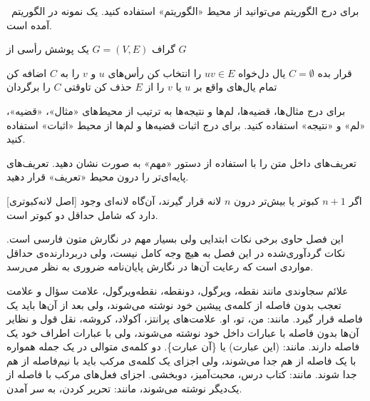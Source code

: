 



برای درج الگوریتم می‌توانید از محیط «الگوریتم» استفاده کنید.
یک نمونه در الگوریتم~ آمده است.

 گراف $G=(V, E)$
 یک پوشش رأسی از $G$

 قرار بده $C = \emptyset$  %
 یال دل‌‌خواه $uv \in E$ را انتخاب کن
 رأس‌های $u$ و $v$ را به $C$ اضافه کن
 تمام یال‌های واقع بر $u$ یا $v$ را از $E$ حذف کن
‌تاوقتی
 $C$ را برگردان



برای درج مثال‌ها، قضیه‌ها، لم‌ها و نتیجه‌ها به ترتیب از محیط‌های
«مثال»، «قضیه»، «لم» و «نتیجه» استفاده کنید.
برای درج اثبات قضیه‌ها و لم‌ها  از محیط «اثبات» استفاده کنید.

تعریف‌های داخل متن را با استفاده از دستور «مهم» به صورت  نشان دهید.
تعریف‌های پایه‌ای‌تر را درون محیط «تعریف» قرار دهید.

[اصل لانه‌کبوتری]
اگر $n+1$ کبوتر یا بیش‌تر درون  $n$ لانه قرار گیرند، آن‌گاه لانه‌ای 
وجود دارد که شامل حداقل دو کبوتر است.





این فصل حاوی برخی نکات ابتدایی ولی بسیار مهم در نگارش متون فارسی است. 
نکات گردآوری‌شده در این فصل به‌ هیچ‌ وجه کامل نیست، 
ولی دربردارنده‌ی حداقل مواردی است که رعایت آن‌ها در نگارش پایان‌نامه ضروری به نظر می‌رسد.



علائم سجاوندی مانند نقطه، ویرگول، دونقطه، نقطه‌ویرگول، علامت سؤال و علامت تعجب %
بدون فاصله از کلمه‌ی پیشین خود نوشته می‌شوند، ولی بعد از آن‌ها باید یک فاصله‌ قرار گیرد. مانند: من، تو، او.
علامت‌های پرانتز، آکولاد، کروشه، نقل قول و نظایر آن‌ها بدون فاصله با عبارات داخل خود نوشته می‌شوند، ولی با عبارات اطراف خود یک فاصله دارند. مانند: (این عبارت) یا \{آن عبارت\}.
دو کلمه‌ی متوالی در یک جمله همواره با یک فاصله از هم جدا می‌شوند، ولی اجزای یک کلمه‌ی مرکب باید با نیم‌فاصله‌‌
 از هم جدا شوند. مانند: کتاب درس، محبت‌آمیز، دوبخشی.
 اجزای فعل‌های مرکب با فاصله از یک‌دیگر نوشته می‌شوند، مانند: تحریر کردن، به سر آمدن.


